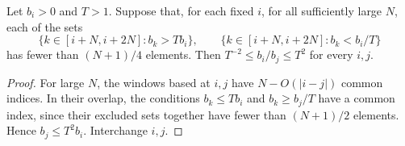 \begin{lemma}
\label{comp:majority-ratios}
Let $b_i>0$ and $T>1$.  Suppose that, for each fixed $i$, for all
sufficiently large $N$, each of the sets
\[
 \{k\in[i+N,i+2N]:b_k>Tb_i\},\qquad
 \{k\in[i+N,i+2N]:b_k<b_i/T\}
\]
has fewer than $(N+1)/4$ elements.  Then $T^{-2}\le b_i/b_j\le T^2$
for every $i,j$.
\end{lemma}

\begin{proof}
For large $N$, the windows based at $i,j$ have $N-O(|i-j|)$ common
indices.  In their overlap, the conditions $b_k\le Tb_i$ and
$b_k\ge b_j/T$ have a common index, since their excluded sets together
have fewer than $(N+1)/2$ elements.  Hence $b_j\le T^2b_i$.
Interchange $i,j$.
\end{proof}
